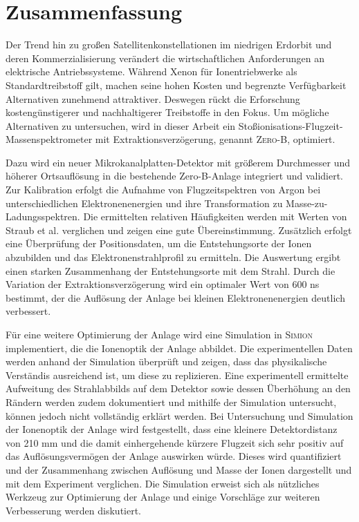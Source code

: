 \chapter*{Zusammenfassung}
Der Trend hin zu großen Satellitenkonstellationen im niedrigen Erdorbit und deren Kommerzialisierung verändert die wirtschaftlichen Anforderungen an elektrische Antriebssysteme. Während Xenon für Ionentriebwerke als Standardtreibstoff gilt, machen seine hohen Kosten und begrenzte Verfügbarkeit Alternativen zunehmend attraktiver. Deswegen rückt die Erforschung kostengünstigerer und nachhaltigerer Treibstoffe in den Fokus. Um mögliche Alternativen zu untersuchen, wird in dieser Arbeit ein Stoßionisations-Flugzeit-Massenspektrometer mit Extraktionsverzögerung, genannt \textsc{Zero-B}, optimiert. 

Dazu wird ein neuer Mikrokanalplatten-Detektor mit größerem Durchmesser und höherer Ortsauflösung in die bestehende Zero-B-Anlage integriert und validiert. Zur Kalibration erfolgt die Aufnahme von Flugzeitspektren von Argon bei unterschiedlichen Elektronenenergien und ihre Transformation zu Masse-zu-Ladungsspektren. Die ermittelten relativen Häufigkeiten werden mit Werten von Straub et al. \cite{Straub} verglichen und zeigen eine gute Übereinstimmung. Zusätzlich erfolgt eine Überprüfung der Positionsdaten, um die Entstehungsorte der Ionen abzubilden und das Elektronenstrahlprofil zu ermitteln. Die Auswertung ergibt einen starken Zusammenhang der Entstehungsorte mit dem Strahl. Durch die Variation der Extraktionsverzögerung wird ein optimaler Wert von 600 ns bestimmt, der die Auflösung der Anlage bei kleinen Elektronenenergien deutlich verbessert.

Für eine weitere Optimierung der Anlage wird eine Simulation in \textsc{Simion} implementiert, die die Ionenoptik der Anlage abbildet. Die experimentellen Daten werden anhand der Simulation überprüft und zeigen, dass das physikalische Verständis ausreichend ist, um diese zu replizieren. Eine experimentell ermittelte Aufweitung des Strahlabbilds auf dem Detektor sowie dessen Überhöhung an den Rändern werden zudem dokumentiert und mithilfe der Simulation untersucht, können jedoch nicht vollständig erklärt werden. Bei Untersuchung und Simulation der Ionenoptik der Anlage wird festgestellt, dass eine kleinere Detektordistanz von 210 mm und die damit einhergehende kürzere Flugzeit sich sehr positiv auf das Auflösungsvermögen der Anlage auswirken würde. Dieses wird quantifiziert und der Zusammenhang zwischen Auflösung und Masse der Ionen dargestellt und mit dem Experiment verglichen. Die Simulation erweist sich als nützliches Werkzeug zur Optimierung der Anlage und einige Vorschläge zur weiteren Verbesserung werden diskutiert.

